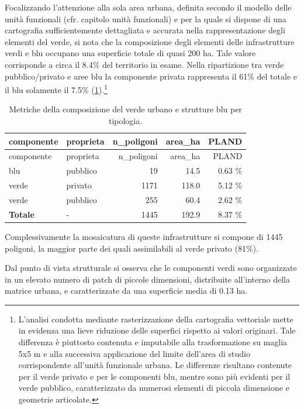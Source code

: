 \documentclass[
  a4paper,
]{book}
\begin{document}
Focalizzando l'attenzione alla sola area urbana, definita secondo il modello delle unità funzionali (cfr. capitolo unità funzionali) e per la quale si dispone di una cartografia sufficientemente dettagliata e accurata nella rappresentazione degli elementi del verde, si nota che la composizione degli elementi delle infrastrutture verdi e blu occupano una superficie totale di quasi 200 ha.
Tale valore corrisponde a circa il 8.4\% del territorio in esame.
Nella ripartizione tra verde pubblico/privato e aree blu la componente privata rappresenta il 61\% del totale e il blu solamente il 7.5\% (\ref{tab:verdeBase}).\footnote{L'analisi condotta mediante rasterizzazione della cartografia vettoriale mette in evidenza una lieve riduzione delle superfici rispetto ai valori originari.
  Tale differenza è piuttosto contenuta e imputabile alla trasformazione su maglia 5x5 m e alla successiva applicazione del limite dell'area di studio corrispondente all'unità funzionale urbana.
  Le differenze risultano contenute per il verde privato e per le componenti blu, mentre sono più evidenti per il verde pubblico, caratterizzato da numerosi elementi di piccola dimensione e geometrie articolate.}

\begin{longtable}[]{@{}llrrr@{}}
\caption{\label{tab:verdeBase} Metriche della composizione del verde urbano e strutture blu per tipologia.}\tabularnewline
\toprule\noalign{}
componente & proprieta & n\_poligoni & area\_ha & PLAND \\
\midrule\noalign{}
\endfirsthead
\toprule\noalign{}
componente & proprieta & n\_poligoni & area\_ha & PLAND \\
\midrule\noalign{}
\endhead
\bottomrule\noalign{}
\endlastfoot
blu & pubblico & 19 & 14.5 & 0.63 \% \\
verde & privato & 1171 & 118.0 & 5.12 \% \\
verde & pubblico & 255 & 60.4 & 2.62 \% \\
\textbf{Totale} & - & 1445 & 192.9 & 8.37 \% \\
\end{longtable}

Complessivamente la mosaicatura di queste infrastrutture si compone di 1445 poligoni, la maggior parte dei quali assimilabili al verde privato (81\%).

Dal punto di vista strutturale si osserva che le componenti verdi sono organizzate in un elevato numero di patch di piccole dimensioni, distribuite all'interno della matrice urbana, e caratterizzate da una superficie media di 0.13 ha.
\end{document}
